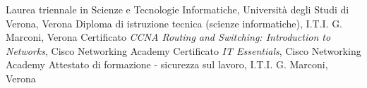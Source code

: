 %
%
%

\medskip

\begin{scholarship}
                                                    {Laurea triennale in Scienze e Tecnologie Informatiche, Università degli Studi di Verona, Verona}
					{Diploma di istruzione tecnica (scienze informatiche), I.T.I. G. Marconi, Verona}
					{Certificato \emph{CCNA Routing and Switching: Introduction to Networks}, Cisco Networking Academy}
					{Certificato \emph{IT Essentials}, Cisco Networking Academy}
					{Attestato di formazione - sicurezza sul lavoro, I.T.I. G. Marconi, Verona}
\end{scholarship}
